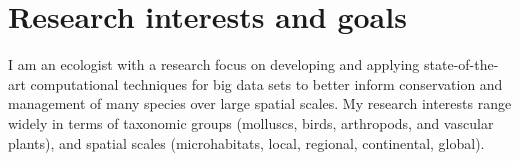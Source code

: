 \section{Research interests and goals}

I am an ecologist with a research focus on 
developing and applying state-of-the-art 
computational techniques for big data sets to better 
inform conservation and management of many species over large spatial scales.
My research interests range widely in terms of taxonomic groups 
(molluscs, birds, arthropods, and vascular plants),
and spatial scales (microhabitats, local, regional, continental, global).
